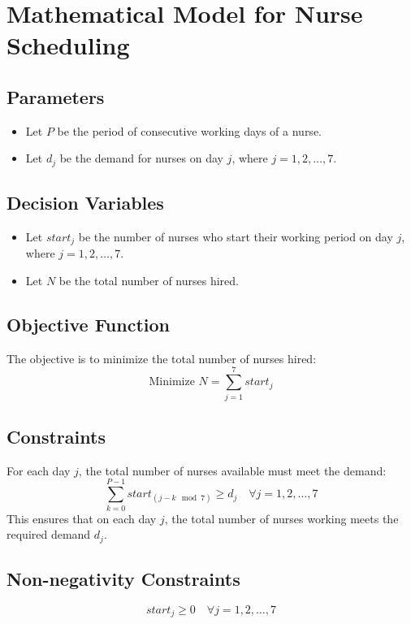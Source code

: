 \documentclass{article}
\begin{document}
\section*{Mathematical Model for Nurse Scheduling}

\subsection*{Parameters}
\begin{itemize}
    \item Let \( P \) be the period of consecutive working days of a nurse.
    \item Let \( d_j \) be the demand for nurses on day \( j \), where \( j = 1, 2, \ldots, 7 \).
\end{itemize}

\subsection*{Decision Variables}
\begin{itemize}
    \item Let \( start_j \) be the number of nurses who start their working period on day \( j \), where \( j = 1, 2, \ldots, 7 \).
    \item Let \( N \) be the total number of nurses hired.
\end{itemize}

\subsection*{Objective Function}
The objective is to minimize the total number of nurses hired:
\[
\text{Minimize } N = \sum_{j=1}^{7} start_j
\]

\subsection*{Constraints}
For each day \( j \), the total number of nurses available must meet the demand:
\[
\sum_{k=0}^{P-1} start_{(j-k \mod 7)} \geq d_j \quad \forall j = 1, 2, \ldots, 7
\]
This ensures that on each day \( j \), the total number of nurses working meets the required demand \( d_j \).

\subsection*{Non-negativity Constraints}
\[
start_j \geq 0 \quad \forall j = 1, 2, \ldots, 7
\]
\end{document}
